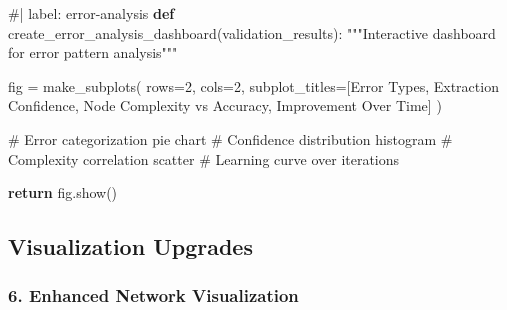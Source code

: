 \documentclass[
  11pt,
  letterpaper,
]{book}
\newenvironment{Shaded}{\begin{snugshade}}{\end{snugshade}}
\newcommand{\CommentTok}[1]{\textcolor[rgb]{0.37,0.37,0.37}{#1}}
\newcommand{\ControlFlowTok}[1]{\textcolor[rgb]{0.00,0.23,0.31}{\textbf{#1}}}
\newcommand{\DecValTok}[1]{\textcolor[rgb]{0.68,0.00,0.00}{#1}}
\newcommand{\KeywordTok}[1]{\textcolor[rgb]{0.00,0.23,0.31}{\textbf{#1}}}
\newcommand{\NormalTok}[1]{\textcolor[rgb]{0.00,0.23,0.31}{#1}}
\newcommand{\OperatorTok}[1]{\textcolor[rgb]{0.37,0.37,0.37}{#1}}
\newcommand{\StringTok}[1]{\textcolor[rgb]{0.13,0.47,0.30}{#1}}
\begin{document}
\begin{Shaded}
\begin{Highlighting}[]
\CommentTok{\#| label: error{-}analysis}
\KeywordTok{def}\NormalTok{ create\_error\_analysis\_dashboard(validation\_results):}
    \CommentTok{"""Interactive dashboard for error pattern analysis"""}
    
\NormalTok{    fig }\OperatorTok{=}\NormalTok{ make\_subplots(}
\NormalTok{        rows}\OperatorTok{=}\DecValTok{2}\NormalTok{, cols}\OperatorTok{=}\DecValTok{2}\NormalTok{,}
\NormalTok{        subplot\_titles}\OperatorTok{=}\NormalTok{[}\StringTok{\textquotesingle{}Error Types\textquotesingle{}}\NormalTok{, }\StringTok{\textquotesingle{}Extraction Confidence\textquotesingle{}}\NormalTok{,}
                       \StringTok{\textquotesingle{}Node Complexity vs Accuracy\textquotesingle{}}\NormalTok{, }\StringTok{\textquotesingle{}Improvement Over Time\textquotesingle{}}\NormalTok{]}
\NormalTok{    )}
    
    \CommentTok{\# Error categorization pie chart}
    \CommentTok{\# Confidence distribution histogram  }
    \CommentTok{\# Complexity correlation scatter}
    \CommentTok{\# Learning curve over iterations}
    
    \ControlFlowTok{return}\NormalTok{ fig.show()}
\end{Highlighting}
\end{Shaded}

\subsection{Visualization Upgrades}\label{visualization-upgrades}

\subsubsection{6. Enhanced Network
Visualization}\label{enhanced-network-visualization}
\end{document}
